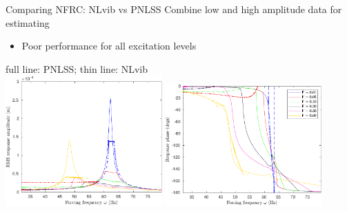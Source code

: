 \documentclass[9pt]{beamer}
\begin{document}
\begin{frame}{Comparing NFRC: NLvib vs PNLSS}
  Combine low and high amplitude data for estimating
  \begin{itemize}
  \item Poor performance for all excitation levels
  \end{itemize}
  \begin{center}
    full line: PNLSS; thin line: NLvib\\
    \includegraphics[width=0.45\textwidth]{fig/pnlssfrf_Acomb_Amp}
    \includegraphics[width=0.45\textwidth]{fig/pnlssfrf_Acomb_Phase}
  \end{center}
\end{frame}
\end{document}

